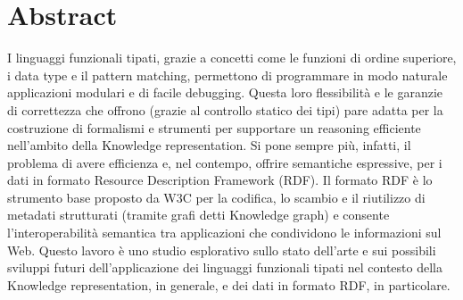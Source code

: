 \chapter{Abstract}
I linguaggi funzionali tipati, grazie a concetti come le funzioni di ordine superiore, i data type e il pattern matching, permettono di programmare in modo naturale applicazioni modulari e di facile debugging.  Questa loro flessibilità e le garanzie di correttezza che offrono (grazie al controllo statico dei tipi) pare adatta per la costruzione di formalismi e strumenti per supportare un reasoning efficiente nell'ambito della Knowledge representation. Si pone sempre più, infatti, il problema di avere efficienza e, nel contempo, offrire semantiche espressive, per i dati in formato Resource Description Framework (RDF). Il formato RDF è lo strumento base proposto da W3C per la codifica, lo scambio e il riutilizzo di metadati strutturati (tramite grafi detti Knowledge graph) e consente l'interoperabilità semantica tra applicazioni che condividono le informazioni sul Web. Questo lavoro è uno studio esplorativo sullo stato dell'arte e sui possibili sviluppi futuri dell'applicazione dei linguaggi funzionali tipati nel contesto della Knowledge representation, in generale, e dei dati in formato RDF, in particolare.